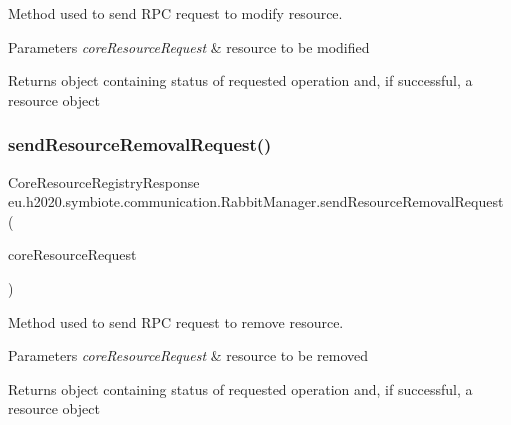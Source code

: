 Method used to send R\+PC request to modify resource.


\begin{DoxyParams}{Parameters}
{\em core\+Resource\+Request} & resource to be modified \\
\hline
\end{DoxyParams}
\begin{DoxyReturn}{Returns}
object containing status of requested operation and, if successful, a resource object 
\end{DoxyReturn}
\mbox{\label{classeu_1_1h2020_1_1symbiote_1_1communication_1_1RabbitManager_a4ccbd77fad17957b8384cf53bf0af5e2}} 
\subsubsection{\texorpdfstring{send\+Resource\+Removal\+Request()}{sendResourceRemovalRequest()}}
{\footnotesize\ttfamily Core\+Resource\+Registry\+Response eu.\+h2020.\+symbiote.\+communication.\+Rabbit\+Manager.\+send\+Resource\+Removal\+Request (\begin{DoxyParamCaption}\item[{Core\+Resource\+Registry\+Request}]{core\+Resource\+Request }\end{DoxyParamCaption})}

Method used to send R\+PC request to remove resource.


\begin{DoxyParams}{Parameters}
{\em core\+Resource\+Request} & resource to be removed \\
\hline
\end{DoxyParams}
\begin{DoxyReturn}{Returns}
object containing status of requested operation and, if successful, a resource object 
\end{DoxyReturn}
\mbox{\label{classeu_1_1h2020_1_1symbiote_1_1communication_1_1RabbitManager_a822ebbed01755311ca9038bb7fa43591}} 
